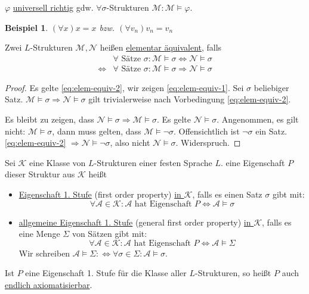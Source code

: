 \documentclass{article}
\theoremstyle{definition}
\theoremstyle{plain}
\newtheorem*{bsp}{Beispiel}
\newcommand{\m}[1]{\mathcal{#1}}
\begin{document}
    $ \varphi $ \underline{universell richtig} gdw. $ \forall \sigma$-Strukturen $ \m{M}: \m{M} \models \varphi $.
    \begin{bsp}
        $ (\forall x) x = x $ bzw. $ (\forall v_n) v_n = v_n $
    \end{bsp}

    Zwei $ L $-Strukturen $ \m{M}, \m{N} $ heißen \underline{elementar äquivalent}, falls
    \begin{align}
        & \forall \text{ Sätze } \sigma: \m{M} \models \sigma \Leftrightarrow \m{N} \models \sigma \label{eq:elem-equiv-1} \\
        \Leftrightarrow & \forall \text{ Sätze } \sigma: \m{M} \models \sigma \Rightarrow \m{N} \models \sigma \label{eq:elem-equiv-2}
    \end{align}

    \begin{proof}
        Es gelte \eqref{eq:elem-equiv-2}, wir zeigen \eqref{eq:elem-equiv-1}.
        Sei $ \sigma $ beliebiger Satz.
        $ \m{M} \models \sigma \Rightarrow \m{N} \models \sigma $
        gilt trivialerweise nach Vorbedingung \eqref{eq:elem-equiv-2}.

        Es bleibt zu zeigen, dass $ \m{N} \models \sigma \Rightarrow \m{M} \models \sigma $.
        Es gelte $ \m{N} \models \sigma $.
        Angenommen, es gilt nicht: $ \m{M} \models \sigma $, dann muss gelten, dass $ \m{M} \models \neg \sigma $.
        Offensichtlich ist $ \neg \sigma $ ein Satz.
        \eqref{eq:elem-equiv-2} $ \Rightarrow \m{N} \models \neg \sigma $, also nicht $ \m{N} \models \sigma $. Widerspruch.
    \end{proof}

    Sei $ \m{K} $ eine Klasse von $ L $-Strukturen einer festen Sprache $ L $.
    eine Eigenschaft $ P$ dieser Struktur aus $ \m{K} $ heißt
    \begin{itemize}
        \item \underline{Eigenschaft 1. Stufe} (first order property) \underline{in $ \m{K} $}, falls es einen Satz $ \sigma $ gibt mit:
        \begin{equation*}
            \forall \m{A} \in \m{K} : \m{A} \text{ hat Eigenschaft } P \Leftrightarrow \m{A} \models \sigma
        \end{equation*}
        \item \underline{allgemeine Eigenschaft 1. Stufe} (general first order property) \underline{in $ \m{K} $}, falls es eine Menge $ \Sigma $ von Sätzen gibt mit:
        \begin{equation*}
            \forall \m{A} \in \m{K} : \m{A} \text{ hat Eigenschaft } P \Leftrightarrow \m{A} \models \Sigma
        \end{equation*}
        Wir schreiben $ \m{A} \models \Sigma :\Leftrightarrow \forall \sigma \in \Sigma: \m{A} \models \sigma $.
    \end{itemize}
    Ist $ P $ eine Eigenschaft 1. Stufe für die Klasse aller $ L $-Strukturen, so heißt $ P $ auch \underline{endlich axiomatisierbar}.
\end{document}
